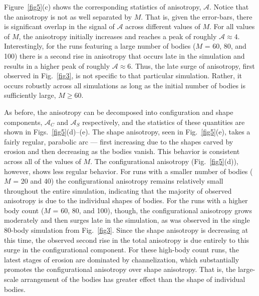 \documentclass[3p]{elsarticle}
\newcommand{\anis}{\mathcal{A}}
\begin{document}
	Figure~\ref{fig5}(c) shows the corresponding statistics of anisotropy, $\anis$. Notice that the anisotropy is not as well separated by $M$. That is, given the error-bars, there is significant overlap in the signal of $\anis$ across different values of $M$. For all values of $M$, the anisotropy initially increases and reaches a peak of roughly $\anis \approx 4$. Interestingly, for the runs featuring a large number of bodies ($M$ = 60, 80, and 100) there is a second rise in anisotropy that occurs late in the simulation and results in a higher peak of roughly $\anis \approx 6$. Thus, the late surge of anisotropy, first observed in Fig.~\ref{fig3}, is not specific to that particular simulation. Rather, it occurs robustly across all simulations as long as the initial number of bodies is sufficiently large, $M \ge 60$.

 	As before, the anisotropy can be decomposed into configuration and shape components, $\anis_C$ and $\anis_S$ respectively, and the statistics of these quantities are shown in Figs.~\ref{fig5}(d)--(e). The shape anisotropy, seen in Fig.~\ref{fig5}(e), takes a fairly regular, parabolic arc --- first increasing due to the shapes carved by erosion and then decreasing as the bodies vanish. This behavior is consistent across all of the values of $M$. The configurational anisotropy (Fig.~\ref{fig5}(d)), however, shows less regular behavior. For runs with a smaller number of bodies ($M$ = 20 and 40) the configurational anisotropy remains relatively small throughout the entire simulation, indicating that the majority of observed anisotropy is due to the individual shapes of bodies. For the runs with a higher body count ($M $ = 60, 80, and 100), though, the configurational anisotropy grows moderately and then surges late in the simulation, as was observed in the single 80-body simulation from Fig.~\ref{fig3}. Since the shape anisotropy is decreasing at this time, the observed second rise in the total anisotropy is due entirely to this surge in the configurational component. For these high-body count runs, the latest stages of erosion are dominated by channelization, which substantially promotes the configurational anisotropy over shape anisotropy. That is, the large-scale arrangement of the bodies has greater effect than the shape of individual bodies.
	
\end{document}
